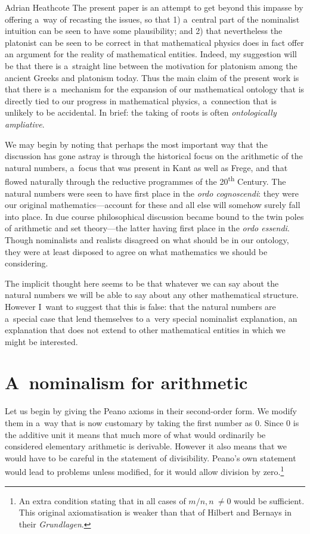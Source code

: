 \begin{artengenv}{Adrian Heathcote}
The present paper is an attempt to get beyond this impasse by offering a~way of recasting the issues, so that 1) a~central part of the nominalist intuition can be seen to have some plausibility; and 2) that nevertheless the platonist can be seen to be correct in that mathematical physics does in fact offer an argument for the reality of mathematical entities. Indeed, my suggestion will be that there is a~straight line between the motivation for platonism among the ancient Greeks and platonism today. Thus the main claim of the present work is that there is a~mechanism for the expansion of our mathematical ontology that is directly tied to our progress in mathematical physics, a~connection that is unlikely to be accidental. In brief: the taking of roots is often \textit{ontologically ampliative}. 

We may begin by noting that perhaps the most important way that the discussion has gone astray is through the historical focus on the arithmetic of the natural numbers, a~focus that was present in Kant as well as Frege, and that flowed naturally through the reductive programmes of the 20\textsuperscript{th} Century. The natural numbers were seen to have first place in the \textit{ordo cognoscendi}: they were our original mathematics---account for these and all else will somehow surely fall into place. In due course philosophical discussion became bound to the twin poles of arithmetic and set theory---the latter having first place in the \textit{ordo essendi}. Though nominalists and realists disagreed on what should be in our ontology, they were at least disposed to agree on what mathematics we should be considering. 

The implicit thought here seems to be that whatever we can say about the natural numbers we will be able to say about any other mathematical structure. However I~want to suggest that this is false: that the natural numbers are a~special case that lend themselves to a~very special nominalist explanation, an explanation that does not extend to other mathematical entities in which we might be interested.



\section{A~nominalism for arithmetic}

Let us begin by giving the Peano axioms in their second-order form. We modify them in a~way that is now customary by taking the first number as 0. Since 0 is the additive unit it means that much more of what would ordinarily be considered elementary arithmetic is derivable. However it also means that we would have to be careful in the statement of divisibility. Peano's own statement would lead to problems unless modified, for it would allow division by zero.\footnote{An extra condition stating that in all cases of $m/n, n~\neq 0$ would be sufficient. This original axiomatisation is weaker than that of Hilbert and Bernays in their \textit{Grundlagen}.}


\end{artengenv}
